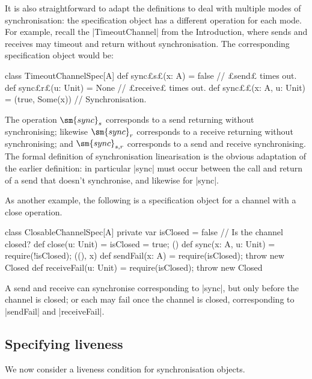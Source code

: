 It is also straightforward to adapt the definitions to deal with multiple
modes of synchronisation: the specification object has a different operation
for each mode.  For example, recall the |TimeoutChannel| from the
Introduction, where sends and receives may timeout and return without
synchronisation.  The corresponding specification object would be:
%
\begin{scala}
class TimeoutChannelSpec[A]{
  def sync£\s s£(x: A) = false       // £send£ times out.
  def sync£\s r£(u: Unit) = None  // £receive£ times out.
  def sync££(x: A, u: Unit) = (true, Some(x))  // Synchronisation.
}
\end{scala}
%
The operation $\sm{sync}_s$ corresponds to a send returning without
synchronising; likewise $\sm{sync}_r$ corresponds to a receive returning
without synchronising; and $\sm{sync}_{s,r}$ corresponds to a send and receive
synchronising.  The formal definition of synchronisation linearisation is the
obvious adaptation of the earlier definition: in particular |sync| must
occur between the call and return of a send that doesn't synchronise, and
likewise for |sync|.

As another example, the following is a specification object for a channel with
a close operation.
%
\begin{scala}
class ClosableChannelSpec[A]{
  private var isClosed = false  // Is the channel closed? 
  def close(u: Unit) = { isClosed = true; () }
  def sync(x: A, u: Unit) = { require(!isClosed); ((), x) }
  def sendFail(x: A) = { require(isClosed); throw new Closed }
  def receiveFail(u: Unit) = { require(isClosed); throw new Closed }
}
\end{scala}
%
A send and receive can synchronise corresponding to |sync|, but only before
the channel is closed; or each may fail once the channel is closed,
corresponding to |sendFail| and |receiveFail|. 


\subsection{Specifying liveness}
\label{sec:progress}

We now consider a liveness condition for synchronisation objects.  

